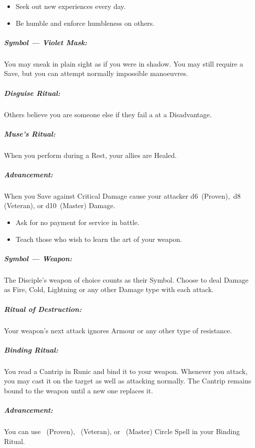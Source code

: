 \documentclass[itdr]{subfiles}
\begin{document}
\vfill
\break

{\em\begin{itemize}
		\item Seek out new experiences every day.
		\item Be humble and enforce humbleness on others.
\end{itemize}}

\subparagraph{Symbol --- Violet Mask:} You may sneak in plain sight as if you were in shadow. You may still require a Save, but you can attempt normally impossible manoeuvres.

\subparagraph{Disguise Ritual:} Others believe you are someone else if they fail a  at a Disadvantage.

\subparagraph{Muse's Ritual:} When you perform during a Rest, your allies are Healed.

\subparagraph{Advancement:} When you Save against Critical Damage cause your attacker d6~(Proven),~d8 (Veteran), or d10~(Master) Damage.

\vspace{2ex}

{\em\begin{itemize}
		\item Ask for no payment for service in battle.
		\item Teach those who wish to learn the art of your weapon.
\end{itemize}}

\subparagraph{Symbol --- Weapon:} The Disciple's weapon of choice counts as their Symbol. Choose to deal Damage as Fire, Cold, Lightning or any other Damage type with each attack.

\subparagraph{Ritual of Destruction:} Your weapon's next attack ignores Armour or any other type of resistance.

\subparagraph{Binding Ritual:} You read a Cantrip in Runic and bind it to your weapon. Whenever you attack, you may cast it on the target as well as attacking normally. The Cantrip remains bound to the weapon until a new one replaces it.

\subparagraph{Advancement:} You can use ~(Proven), ~(Veteran), or ~(Master) Circle Spell in your Binding Ritual.

\vfill

\begin{comment}

\creed{???}
{\em\begin{itemize}
\item ???
\item ???
\end{itemize}}

\subparagraph{Symbol --- ???:}

\subparagraph{??? Ritual:}

\subparagraph{??? Ritual:}

\subparagraph{Advancement:}

\end{comment}
\end{document}
